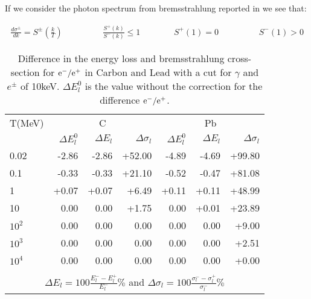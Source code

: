 If we consider the photon spectrum from bremsstrahlung reported
in \cite{bib-KIM1} we see that:

\begin{eqnarray*}
\frac{d\sigma^{\pm}}{dk} = S^{\pm} \left( \frac{k}{T} \right )
\hspace{2cm}
\frac{S^{+}(k)}{S^{-}(k)} \leq 1 & \hspace{1cm} & S^{+}(1) = 0  
\hspace{2cm} S^{-}(1)  >  0 
\end{eqnarray*}

\begin{table}[hbt]
\begin{centering}
\begin{tabular}{l|rrr|rrr}
\hline
\multicolumn{1}{c}{T(MeV)}
& \multicolumn{3}{|c|}{C}
& \multicolumn{3}{c}{Pb} \\[2mm]
\hspace{1cm}
& $\Delta E^{0}_{l}$ & $\Delta E_{l}$ & $\Delta \sigma_{l}$ 
& $\Delta E^{0}_{l}$ & $\Delta E_{l}$ & $\Delta \sigma_{l}$ \\
\hline
0.02   & -2.86 & -2.86 & +52.00 & -4.89 & -4.69 & +99.80 \\
0.1    & -0.33 & -0.33 & +21.10 & -0.52 & -0.47 & +81.08 \\
1      & +0.07 & +0.07 &  +6.49 & +0.11 & +0.11 & +48.99 \\
10     &  0.00 &  0.00 &  +1.75 &  0.00 & +0.01 & +23.89 \\
$10^2$ &  0.00 &  0.00 &   0.00 &  0.00 &  0.00 &  +9.00 \\
$10^3$ &  0.00 &  0.00 &   0.00 &  0.00 &  0.00 &  +2.51 \\
$10^4$ &  0.00 &  0.00 &   0.00 &  0.00 &  0.00 &  +0.00 \\
\hline
\multicolumn{7}{c}{\hspace{1cm}} \\
\multicolumn{7}{c}{
$\displaystyle{\Delta E_{l} =
100 \frac{E^{-}_{l}-E^{+}_{l}}{E^{-}_{l}}\%}$ \hspace{5mm} and
\hspace{5mm}
$\displaystyle{\Delta \sigma_{l} =
100 \frac{\sigma^{-}_{l}-\sigma^{+}_{l}}{\sigma^{-}_{l}}\%}$
}
\end{tabular}
\caption{Difference in the energy loss and bremsstrahlung
cross-section for $\mathrm{e}^-/\mathrm{e}^+$ in Carbon and Lead with a 
cut for $\gamma$ and $e^{\pm}$ of 10keV. $\Delta E^{0}_{l}$ is
the value without the correction for the difference
$\mathrm{e}^-/\mathrm{e}^+$.}
\label{tb:phys340-2}
\end{centering}
\end{table}

